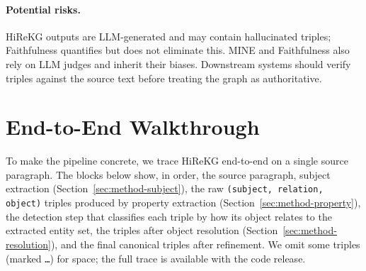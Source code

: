 \documentclass[11pt]{article}
\begin{document}
\paragraph{Potential risks.}
HiReKG outputs are LLM-generated and may contain hallucinated triples; Faithfulness quantifies but does not eliminate this. MINE and Faithfulness also rely on LLM judges and inherit their biases. Downstream systems should verify triples against the source text before treating the graph as authoritative.




%

\appendix

\newcommand{\stageblock}[2]{%
  \par\vspace{0.5\baselineskip}%
  \noindent\rule{\linewidth}{0.6pt}\par
  \noindent\textbf{#1}\par
  \vspace{0.15\baselineskip}%
  \begingroup
    \footnotesize
    \setlength{\parskip}{0pt}%
    \setlength{\leftskip}{0.5em}%
    #2
  \endgroup
  \par\vspace{0.25\baselineskip}%
}

\newcommand{\substage}[1]{\par\vspace{0.15\baselineskip}\noindent\emph{#1}\par}

\section{End-to-End Walkthrough}
\label{app:walkthrough}

To make the pipeline concrete, we trace HiReKG end-to-end on a single source paragraph. The blocks below show, in order, the source paragraph, subject extraction (Section~\ref{sec:method-subject}), the raw \texttt{(subject, relation, object)} triples produced by property extraction (Section~\ref{sec:method-property}), the detection step that classifies each triple by how its object relates to the extracted entity set, the triples after object resolution (Section~\ref{sec:method-resolution}), and the final canonical triples after refinement. We omit some triples (marked \texttt{\dots}) for space; the full trace is available with the code release.
\end{document}
